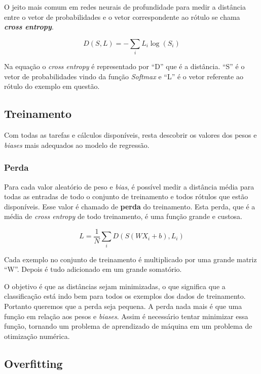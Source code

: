 O jeito mais comum em redes neurais de profundidade para medir a
distância entre o vetor de probabilidades e o vetor correspondente ao
rótulo se chama {\bf \emph{cross entropy}}.

\begin{equation}
   D(S,L) = - \displaystyle\sum_{i}L_i  {\log (S_i)}
\end{equation}

Na equação o \textit{cross entropy} é representado por ``D'' que é a
distância. ``S'' é o vetor de probabilidades vindo da função
\textit{Softmax} e ``L'' é o vetor referente ao rótulo do exemplo em
questão.

\subsection{Treinamento}

Com todas as tarefas e cálculos disponíveis, resta descobrir os
valores dos pesos e \textit{biases} mais adequados ao modelo de
regressão.

\subsubsection{Perda}

Para cada valor aleatório de peso e \textit{bias}, é possível medir a
distância média para todas as entradas de todo o conjunto de
treinamento e todos rótulos que estão disponíveis. Esse valor é
chamado de {\bf perda} do treinamento. Esta perda, que é a média de
\textit{cross entropy} de todo treinamento, é uma função grande e
custosa.

\begin{equation}
  L = \displaystyle\frac{1}{N}\displaystyle\sum_iD(S(WX_i + b), L_i)
\end{equation}

Cada exemplo no conjunto de treinamento é multiplicado por uma grande
matriz ``W''. Depois é tudo adicionado em um grande somatório.

O objetivo é que as distâncias sejam minimizadas, o que significa que a
classificação está indo bem para todos os exemplos dos dados de
treinamento. Portanto queremos que a perda seja pequena. A
perda nada mais é que uma função em relação aos pesos e
\textit{biases}. Assim é necessário tentar minimizar essa função,
tornando um problema de aprendizado de máquina em um problema de
otimização numérica.

\subsection{Overfitting}


